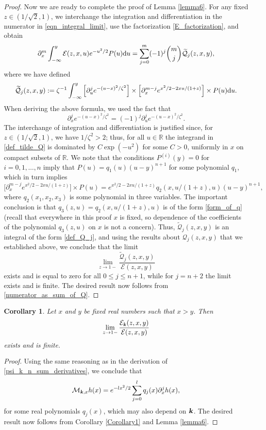 \documentclass[12pt]{article}
\def\E{{\mathcal E}}
\def\r{{\mathbb R}}
\def\d{{\textnormal d}}
\def\k{\textbf{\textsl{k}}}
\newtheorem{corollary}{Corollary}
\begin{document}
\begin{proof}
Now we are ready to complete the proof of Lemma \ref{lemma6}. For any fixed $z\in (1/\sqrt{2},1)$, we interchange the integration and differentiation in the numerator in \eqref{eqn_integral_limit},   
use the factorization \eqref{E_factorization}, and obtain
\begin{equation}\label{numerator_as_sum_of_Q}
\partial_x^{m} \int_{-\infty}^y \E(z,x,u) e^{-u^2/2}  P(u) \d u
= \sum\limits_{j=0}^m (-1)^j \binom{m}{j} \widetilde {\mathcal Q}_{j}(z,x,y),
\end{equation}
where we have defined 
\begin{equation}\label{def_tilde_Q}
\widetilde {\mathcal Q}_{j}(z,x,y):=\zeta^{-1} \int_{-\infty}^y
\Big[ \partial_u^{j} e^{-(u-x)^2/\zeta^2} \Big]  \times \Big[ \partial_x^{m-j} e^{x^2/2-2xu/(1+z)} \Big]  \times P(u) \d u.
\end{equation}
When deriving the above formula, we used the fact that 
\[
\partial_x^{j} e^{-(u-x)^2/\zeta^2}=(-1)^j \partial_u^{j} e^{-(u-x)^2/\zeta^2}. 
\]
The interchange of integration and differentiation is justified since, for $z\in (1/\sqrt{2},1)$, we have $1/\zeta^2>2$; thus, for all $u\in \r$ the integrand in \eqref{def_tilde_Q} is dominated by $C\exp(- u^2)$ for some $C>0$, uniformly in $x$ on compact subsets of $\r$.  We note that the conditions  $P^{(i)}(y)=0$ for $i=0,1,\dots,n$ imply that $P(u)=q_1(u) (u-y)^{n+1}$ for some polynomial $q_1$, which in turn implies
\[
\Big[ \partial_x^{m-j} e^{x^2/2-2xu/(1+z)} \Big] \times  P(u)=
e^{x^2/2-2xu/(1+z)} q_2(x,u/(1+z),u) (u-y)^{n+1},
\]
where $q_2(x_1,x_2,x_3)$ is some polynomial in three variables.   The important conclusion is that $q_3(z,u)=q_2(x,u/(1+z),u)$ is of the form \eqref{form_of_q} (recall that everywhere in this proof $x$ is fixed, so dependence of the coefficients of the polynomial $q_3(z,u)$ on $x$ is not a concern). Thus, $\widetilde {\mathcal Q}_{j}(z,x,y)$ is an integral of the form \eqref{def_Q_j}, and using the results about ${\mathcal Q}_j(z,x,y)$ that we established above, we conclude that the limit  
\[
\lim\limits_{z\to 1-} \frac{\widetilde {\mathcal Q}_{j}(z,x,y)}{\E(z,x,y)} 
\]
exists and is equal to zero for all $0\leqslant j \leqslant n+1$, while for $j=n+2$ the limit exists and is finite. The desired result now follows from \eqref{numerator_as_sum_of_Q}.
\end{proof}

\begin{corollary}\label{Corollary2}
Let  $x$ and $y$ be fixed real numbers such that $x>y$. Then 
\[
\lim_{z\to 1-} \frac{\E_{\k}(z,x,y)}{\E(z,x,y)}
\]
exists and is finite. 
\end{corollary}
\begin{proof}
Using the same reasoning as in the derivation of \eqref{psi_k_n_sum_derivatives}, we conclude that 
\begin{equation}\label{M_kx_h}
{\mathcal M}_{\k,x} h(x)=e^{-l x^2/2} \sum\limits_{j=0}^l q_{j}(x) \partial_x^j h(x), 
\end{equation}
for some real polynomials $q_j(x)$, which may also depend on $\k$. 
The desired result now follows from Corollary \ref{Corollary1} and Lemma \ref{lemma6}. 
\end{proof}
\end{document}
